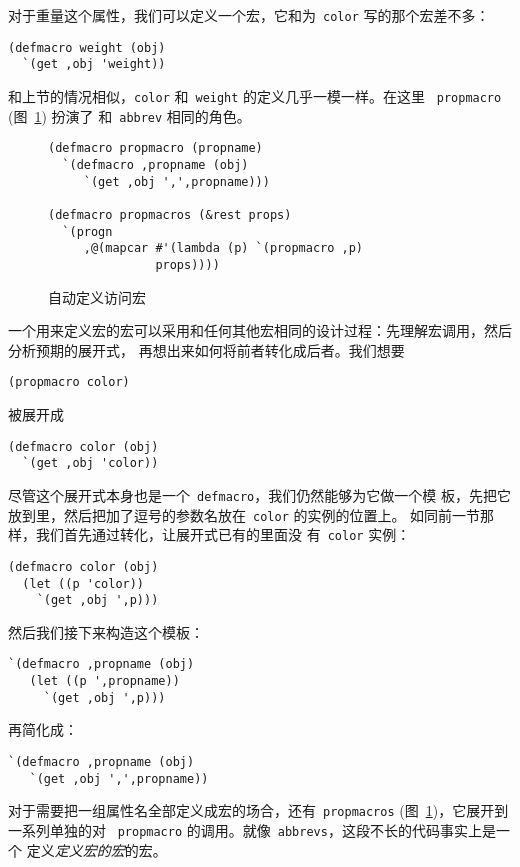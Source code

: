 对于重量这个属性，我们可以定义一个宏，它和为~\texttt{color} 写的那个宏差不多：
\begin{lstlisting}
(defmacro weight (obj)
  `(get ,obj 'weight))
\end{lstlisting}
和上节的情况相似，\texttt{color} 和~\texttt{weight} 的定义几乎一模一样。在这里
~\texttt{propmacro} (图~\ref{fig:automatic_definition_of_access_macros}) 扮演了
和~\texttt{abbrev} 相同的角色。

\begin{figure}
\begin{lstlisting}
(defmacro propmacro (propname)
  `(defmacro ,propname (obj)
     `(get ,obj ',',propname)))

(defmacro propmacros (&rest props)
  `(progn
     ,@(mapcar #'(lambda (p) `(propmacro ,p)
               props))))
\end{lstlisting}
  \caption{自动定义访问宏}
  \label{fig:automatic_definition_of_access_macros}
\end{figure}

一个用来定义宏的宏可以采用和任何其他宏相同的设计过程：先理解宏调用，然后分析预期的展开式，
再想出来如何将前者转化成后者。我们想要
\begin{lstlisting}
(propmacro color)
\end{lstlisting}
被展开成
\begin{lstlisting}
(defmacro color (obj)
  `(get ,obj 'color))
\end{lstlisting}
尽管这个展开式本身也是一个~\texttt{defmacro}，我们仍然能够为它做一个模
板，先把它放到\bq{}里，然后把加了逗号的参数名放在~\texttt{color} 的实例的位置上。
如同前一节那样，我们首先通过转化，让展开式已有的\bq{}里面没
有~\texttt{color} 实例：
\begin{lstlisting}
(defmacro color (obj)
  (let ((p 'color))
    `(get ,obj ',p)))
\end{lstlisting}
然后我们接下来构造这个模板：
\begin{lstlisting}
`(defmacro ,propname (obj)
   (let ((p ',propname))
     `(get ,obj ',p)))
\end{lstlisting}
再简化成：
\begin{lstlisting}
`(defmacro ,propname (obj)
   `(get ,obj ',',propname))
\end{lstlisting}

对于需要把一组属性名全部定义成宏的场合，还有~\texttt{propmacros}
(图~\ref{fig:automatic_definition_of_access_macros})，它展开到一系列单独的对
~\texttt{propmacro} 的调用。就像~\texttt{abbrevs}，这段不长的代码事实上是一个
定义\emph{定义宏的宏}的宏。

